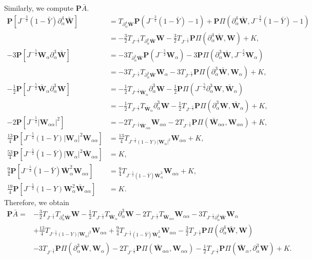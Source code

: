 \documentclass[10pt]{amsart}
\theoremstyle{remark}
\theoremstyle{definition}
\numberwithin{equation}{section}
\newcommand{\p}{\partial}
\newcommand{\al}{\alpha}
\newcommand{\f}{\frac}
\newcommand{\bw}{\mathbf{W}}
\newcommand{\nP}{{\mathbf P}}
\begin{document}
Similarly, we compute $\nP \bar{A}$.
\begin{align*}
\nP [J^{-\f{3}{2}}(1-\bar{Y})\p^4_{\al}\bar{\bw}] 
    &= T_{\p^4_{\al}\bar{\bw}}\nP(J^{-\f{3}{2}}(1-\bar{Y})-1)+\nP\Pi(\p^4_{\al}\bar{\bw},J^{-\f{3}{2}}(1-\bar{Y})-1) \\
    &= - \f{3}{2} T_{J^{-\f{5}{2}}}T_{\p^4_{\al}\bar{\bw}} \bw -\f{3}{2} T_{J^{-\f{5}{2}}}\nP\Pi(\p^4_{\al}\bar{\bw}, \bw)+K,\\
-3\nP[ J^{-\f{5}{2}}\bw_{\al}\p^3_{\al}\bar{\bw}] 
    &= - 3 T_{\p^3_{\al}\bar{\bw}} \nP (J^{-\f{5}{2}}\bw_{\al}) - 3\nP\Pi(\p^3_{\al}\bar{\bw}, J^{-\f{5}{2}}\bw_{\al}) \\
    &= -3 T_{J^{-\f{5}{2}}}T_{\p^3_{\al}\bar{\bw}}\bw_{\al} - 3T_{J^{-\f{5}{2}}}\nP\Pi(\p^3_{\al}\bar{\bw}, \bw_{\al}) +K, \\
-\f{1}{2} \nP[J^{-\f{5}{2}}\bar{\bw}_{\al}\p^3_{\al}\bw] 
    &= -\f{1}{2} T_{J^{-\f{5}{2}}\bar{\bw}_{\al}} \p^3_{\al}\bw -\f{1}{2} \nP \Pi(J^{-\f{5}{2}}\p^3_{\al}\bw, \bar{\bw}_{\al}) \\
    &= -\f{1}{2} T_{J^{-\f{5}{2}}}T_{\bar{\bw}_{\al}} \p^3_{\al}\bw -\f{1}{2} T_{J^{-\f{5}{2}}}\nP \Pi(\p^3_{\al}\bw, \bar{\bw}_{\al}) + K, \\
-2 \nP [J^{-\f{5}{2}}|\bw_{\al\al}|^2] 
    &= -2 T_{J^{-\f{5}{2}}\bar{\bw}_{\al \al}}\bw_{\al \al} -2 T_{J^{-\f{5}{2}}} \nP \Pi(\bar{\bw}_{\al \al}, \bw_{\al \al}) + K , \\
\f{13}{4}\nP[J^{-\f{5}{2}}(1-Y)|\bw_{\al}|^2\bw_{\al\al}] 
    &= \f{13}{4}T_{J^{-\f{5}{2}}(1-Y)|\bw_{\al}|^2}\bw_{\al\al}+K , \\
\f{53}{4} \nP[J^{-\f{5}{2}}(1-\bar{Y})|\bw_{\al}|^2\bar{\bw}_{\al\al}] 
    &= K, \\
\f{9}{4}\nP [J^{-\f{5}{2}}(1-\bar{Y})\bar{\bw}^2_{\al}\bw_{\al\al}] 
    &= \f{9}{4} T_{J^{-\f{5}{2}}(1-\bar{Y})\bar{\bw}^2_{\al}}\bw_{\al\al}+K, \\
\f{19}{4} \nP [J^{-\f{5}{2}}(1-Y)\bw_{\al}^2\bar{\bw}_{\al\al}] 
    &= K.
\end{align*}
Therefore, we obtain
\begin{align*}
\nP\bar{A}=&- \f32 T_{J^{-\f52}}T_{\p^4_{\al}\bar{\bw}} \bw 
-\f12 T_{J^{-\f52}}T_{\bar{\bw}_{\al}} \p^3_{\al}\bw 
-2 T_{J^{-\f52}}T_{\bar{\bw}_{\al \al}}\bw_{\al \al} -3 T_{J^{-\f52}\p^3_{\al}\bar{\bw}}\bw_{\al}
\\
&+\f{13}{4}T_{J^{-\f52}(1-Y)|\bw_{\al}|^2}\bw_{\al\al}+\f94 T_{J^{-\f52}(1-\bar{Y})\bar{\bw}^2_{\al}}\bw_{\al\al}-\f32 T_{J^{-\f52}}\nP\Pi(\p^4_{\al}\bar{\bw}, \bw)\\
&- 3T_{J^{-\f52}}\nP\Pi(\p^3_{\al}\bar{\bw}, \bw_{\al}) -2 T_{J^{-\f52}} \nP \Pi(\bar{\bw}_{\al \al}, \bw_{\al \al}) -\f12 T_{J^{-\f52}}\nP \Pi(\bar{\bw}_{\al},
\p^3_{\al}\bw) + K.
\end{align*}
\end{document}
